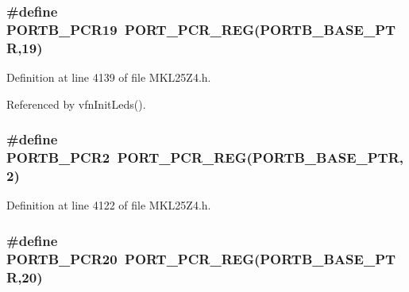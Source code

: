 \subsubsection[{\texorpdfstring{P\+O\+R\+T\+B\+\_\+\+P\+C\+R19}{PORTB_PCR19}}]{\setlength{\rightskip}{0pt plus 5cm}\#define P\+O\+R\+T\+B\+\_\+\+P\+C\+R19~{\bf P\+O\+R\+T\+\_\+\+P\+C\+R\+\_\+\+R\+EG}({\bf P\+O\+R\+T\+B\+\_\+\+B\+A\+S\+E\+\_\+\+P\+TR},19)}\hypertarget{group___p_o_r_t___register___accessor___macros_ga350d0f2af48e5da843dedd499c0fd003}{}\label{group___p_o_r_t___register___accessor___macros_ga350d0f2af48e5da843dedd499c0fd003}


Definition at line 4139 of file M\+K\+L25\+Z4.\+h.



Referenced by vfn\+Init\+Leds().

\subsubsection[{\texorpdfstring{P\+O\+R\+T\+B\+\_\+\+P\+C\+R2}{PORTB_PCR2}}]{\setlength{\rightskip}{0pt plus 5cm}\#define P\+O\+R\+T\+B\+\_\+\+P\+C\+R2~{\bf P\+O\+R\+T\+\_\+\+P\+C\+R\+\_\+\+R\+EG}({\bf P\+O\+R\+T\+B\+\_\+\+B\+A\+S\+E\+\_\+\+P\+TR},2)}\hypertarget{group___p_o_r_t___register___accessor___macros_ga7fef983fbfddc2cc33547e2942dd5e1b}{}\label{group___p_o_r_t___register___accessor___macros_ga7fef983fbfddc2cc33547e2942dd5e1b}


Definition at line 4122 of file M\+K\+L25\+Z4.\+h.

\subsubsection[{\texorpdfstring{P\+O\+R\+T\+B\+\_\+\+P\+C\+R20}{PORTB_PCR20}}]{\setlength{\rightskip}{0pt plus 5cm}\#define P\+O\+R\+T\+B\+\_\+\+P\+C\+R20~{\bf P\+O\+R\+T\+\_\+\+P\+C\+R\+\_\+\+R\+EG}({\bf P\+O\+R\+T\+B\+\_\+\+B\+A\+S\+E\+\_\+\+P\+TR},20)}\hypertarget{group___p_o_r_t___register___accessor___macros_ga51aa6628c3f9eb5249cf9c9e6854462d}{}\label{group___p_o_r_t___register___accessor___macros_ga51aa6628c3f9eb5249cf9c9e6854462d}


